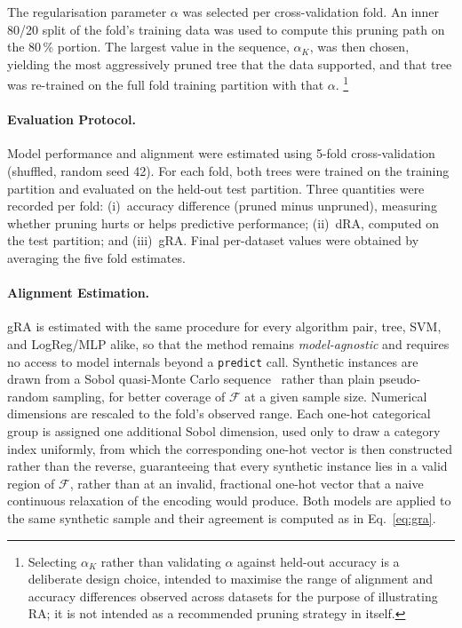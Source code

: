 \documentclass[runningheads]{llncs}
\begin{document}
The regularisation parameter $\alpha$ was selected per cross-validation fold. An inner 80/20 split of the fold's training data was used to compute this pruning path on the 80\,\% portion. The largest value in the sequence, $\alpha_K$, was then chosen, yielding the most aggressively pruned tree that the data supported, and that tree was re-trained on the full fold training partition with that $\alpha$.%
\footnote{Selecting $\alpha_K$ rather than validating $\alpha$ against held-out accuracy is a deliberate design choice, intended to maximise the range of alignment and accuracy differences observed across datasets for the purpose of illustrating RA; it is not intended as a recommended pruning strategy in itself.}

\paragraph{Evaluation Protocol.}
Model performance and alignment were estimated using 5-fold cross-validation (shuffled, random seed 42). For each fold, both trees were trained on the training partition and evaluated on the held-out test partition. Three quantities were recorded per fold: (i)~accuracy difference (pruned minus unpruned), measuring whether pruning hurts or helps predictive performance; (ii)~dRA, computed on the test partition; and (iii)~gRA. Final per-dataset values were obtained by averaging the five fold estimates.

\paragraph{Alignment Estimation.}
\label{sec:alignment-estimation}
gRA is estimated with the same procedure for every algorithm pair, tree, SVM, and LogReg/MLP alike, so that the method remains \emph{model-agnostic} and requires no access to model internals beyond a \texttt{predict} call. Synthetic instances are drawn from a Sobol quasi-Monte Carlo sequence~\cite{Joe2008} rather than plain pseudo-random sampling, for better coverage of $\mathcal{F}$ at a given sample size. Numerical dimensions are rescaled to the fold's observed range. Each one-hot categorical group is assigned one additional Sobol dimension, used only to draw a category index uniformly, from which the corresponding one-hot vector is then constructed rather than the reverse, guaranteeing that every synthetic instance lies in a valid region of $\mathcal{F}$, rather than at an invalid, fractional one-hot vector that a naive continuous relaxation of the encoding would produce. Both models are applied to the same synthetic sample and their agreement is computed as in Eq.~\eqref{eq:gra}.
\end{document}
